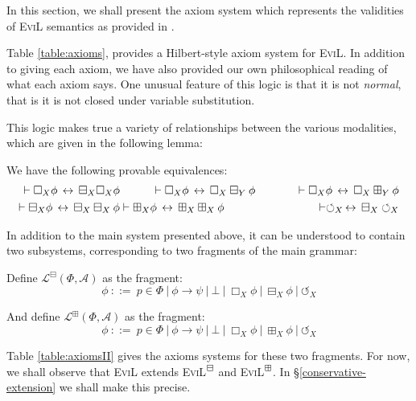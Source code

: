 In this section, we shall present the axiom system which represents
the validities of \textsc{EviL} semantics as provided in . 

Table \ref{table:axioms}, provides a Hilbert-style axiom system for \textsc{EviL}.  In addition to giving each axiom, we have also provided our own philosophical reading of what each axiom says.  One unusual feature of this logic is that it is not \emph{normal}, that is it is not closed under variable substitution.



This logic makes true a variety of relationships between the various
modalities, which are given in the following lemma:
\begin{lemma}\label{equivs}
We have the following provable equivalences:
\begin{eqnarray*} \vdash \Box_X \phi \,\leftrightarrow\, \boxminus_X \Box_X \phi & \hspace{1cm} \vdash \Box_X \phi \,\leftrightarrow\, \Box_X \boxminus_Y \phi \hspace{1cm}  & \vdash \Box_X \phi \,\leftrightarrow\, \Box_X \boxplus_Y \phi \\
 \vdash \boxminus_X \phi \,\leftrightarrow\, \boxminus_X \boxminus_X \phi & \vdash \boxplus_X \phi \,\leftrightarrow\, \boxplus_X \boxplus_X \phi & \vdash \circlearrowleft_X \,\leftrightarrow\, \boxminus_X \circlearrowleft_X\end{eqnarray*}
\end{lemma}

In addition to the main system presented above, it can be understood to contain two subsystems, corresponding to two fragments of the main grammar:
\begin{definition}
Define $\mathcal{L}^\boxminus (\Phi, \mathcal{A})$ as the fragment:
\[ \phi \ {::=} \  p \in \Phi \  | \  \phi
   \rightarrow \psi \  | \  \bot \  |
   \  \Box_X \phi \  | \  \boxminus_X \phi
 \  | \ 
   \circlearrowleft_X \]

And define $\mathcal{L}^\boxplus (\Phi, \mathcal{A})$ as the fragment:
\[ \phi \ {::=} \  p \in \Phi \  | \  \phi
   \rightarrow \psi \  | \  \bot \  |
   \  \Box_X \phi 
   \  | \  \boxplus_X \phi
 \  | \ 
   \circlearrowleft_X \]
\end{definition}

Table \ref{table:axiomsII} gives the axioms systems for these two fragments.  For now, we shall observe that \textsc{EviL} extends \textsc{EviL}$^\boxminus$ and \textsc{EviL}$^\boxplus$.  In \S\ref{conservative-extension} we shall make this precise. 


